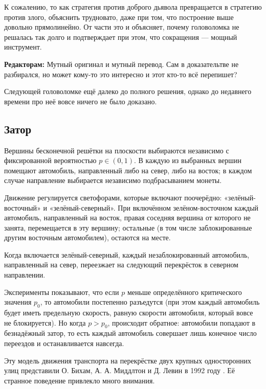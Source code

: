 К сожалению, то как стратегия против доброго дьявола превращается в стратегию против злого, объяснить трудновато, даже при том, что построение выше довольно прямолинейно.
От части это и объясняет, почему головоломка не решалась так долго и подтверждает при этом, что сокращения --- мощный инструмент.

\begin{addedbytheeditors}
\textbf{Редакторам:} Мутный оригинал и мутный перевод. Сам в доказательтве не разбирался, но может кому-то это интересно и этот кто-то всё перепишет?
\end{addedbytheeditors}


\medskip

Следующей головоломке ещё далеко до полного решения,
однако до недавнего времени про неё вовсе ничего не было доказано.

\subsection*{Затор}

Вершины бесконечной решётки на плоскости выбираются независимо с
фиксированной вероятностью $p\in (0,1)$.
В каждую из выбранных вершин
помещают автомобиль, направленный либо на север, либо на восток;
в каждом случае направление выбирается независимо подбрасыванием монеты.

Движение регулируется светофорами, которые включают поочерёдно:
«зелёный-восточный» и «зелёный-северный».
При включённом
зелёном-восточном каждый автомобиль, направленный на восток, правая
соседняя вершина от которого не занята, перемещается в эту вершину;
остальные (в том числе заблокированные другим восточным автомобилем),
остаются на месте.

Когда включается зелёный-северный, каждый незаблокированный
автомобиль, направленный на север, переезжает на следующий перекрёсток в
северном направлении.

Эксперименты показывают, что если $p$ меньше определённого
критического значения $p_0$, то автомобили постепенно разъедутся
(при этом каждый автомобиль будет иметь предельную скорость,
равную скорости автомобиля, который вовсе не блокируется).
Но когда
$p> p_0$, происходит обратное: автомобили попадают в безнадёжный
затор, то есть каждый автомобиль совершает лишь конечное число переездов
и останавливается навсегда.

Эту модель движения транспорта на перекрёстке двух крупных односторонних улиц представили О. Бихам, А. А. Миддлтон и Д. Левин в 1992 году \cite{6}.
Её странное поведение привлекло много внимания.

